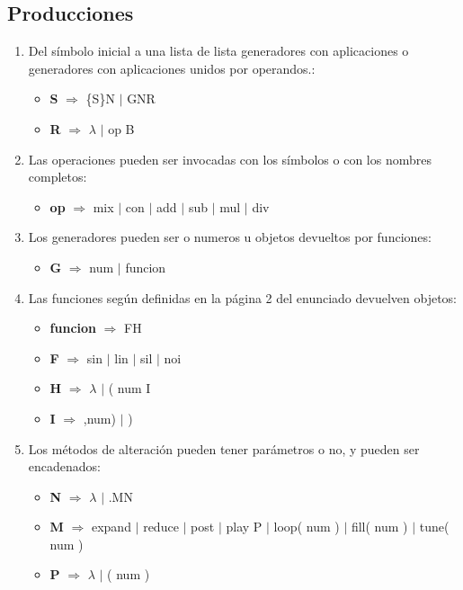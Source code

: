 \documentclass[a4paper]{article}
\begin{document}
\subsection{Producciones}
\begin{enumerate}
\item Del símbolo inicial a una lista de lista generadores con aplicaciones o generadores con aplicaciones unidos por operandos.:

\begin{itemize}
\item \textbf{S} $\Rightarrow$ \{S\}N $|$ GNR 
\item \textbf{R} $\Rightarrow$ $\lambda$ $|$ op B 
\end{itemize}

\item Las operaciones pueden ser invocadas con los símbolos o con los nombres completos:
\begin{itemize}
\item \textbf{op} $\Rightarrow$ mix $|$ con $|$ add $|$ sub $|$ mul $|$ div 
\end{itemize}


\item Los generadores pueden ser o numeros u objetos devueltos por funciones:
\begin{itemize}
\item \textbf{G} $\Rightarrow$ num $|$ funcion 
\end{itemize}

\item Las funciones según definidas en la página 2 del enunciado devuelven objetos:
\begin{itemize}
\item \textbf{funcion} $\Rightarrow$  FH 
\item \textbf{F} $\Rightarrow$ sin $|$ lin $|$ sil $|$ noi 
\item \textbf{H} $\Rightarrow$ $\lambda$ $|$ ( num I 
\item \textbf{I} $\Rightarrow$ ,num) $|$ ) 
\end{itemize}	

\item Los métodos de alteración pueden tener parámetros o no, y pueden ser encadenados:

\begin{itemize}
\item \textbf{N} $\Rightarrow$ $\lambda$ $|$ .MN 
\item \textbf{M} $\Rightarrow$ expand $|$ reduce $|$ post $|$ play P $|$ loop( num ) $|$ fill( num ) $|$ tune( num ) 
\item \textbf{P} $\Rightarrow$ $\lambda$ $|$ ( num ) 
\end{itemize}

\end{enumerate}
\end{document}
